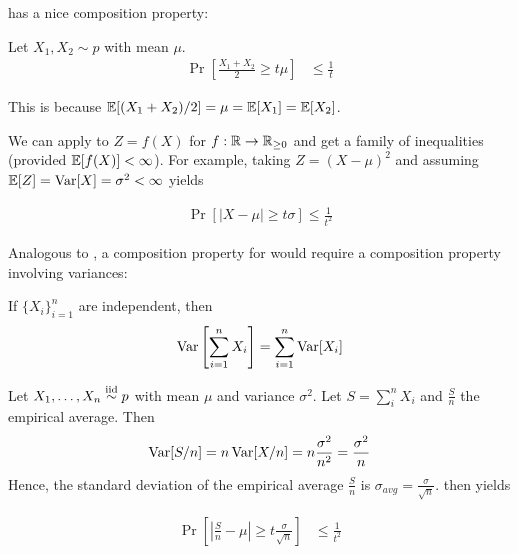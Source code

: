  has a nice composition property:
\begin{theorem}\label{thm:markov-composition}
    Let $X_1, X_2 \sim p$ with mean $\mu$.
    \begin{align}
        \Pr\left[ \frac{X_1 + X_2}{2} \geq t \mu \right] &\leq \frac{1}{t}
    \end{align}
\end{theorem}
This is because $\mathbb{E}[(X_1 + X_2) / 2] = \mu = \mathbb{E}[X_1] = \mathbb{E}[X_2]$.

We can apply  to $Z = f(X)$ for $f : \mathbb{R} \to \mathbb{R}_{\geq 0}$
and get a family of inequalities
(provided $\mathbb{E}[f(X)] < \infty$).
For example, taking $Z = (X - \mu)^2$ and assuming $\mathbb{E}[Z] = \operatorname{Var}[X] = \sigma^2 < \infty$ yields
\begin{theorem}\label{thm:chebyshev}
    \begin{align}
        \Pr[\lvert X - \mu\rvert \geq t \sigma] \leq \frac{1}{t^2}
    \end{align}
\end{theorem}

Analogous to ,
a composition property for  would require a composition property involving variances:
\begin{theorem}
    If $\{X_i\}_{i=1}^n$ are independent, then
    \begin{align}
        \operatorname{Var}\left[ \sum_{i=1}^n X_i \right] = \sum_{i=1}^n \operatorname{Var}[X_i]
    \end{align}
\end{theorem}

\begin{example}
    Let $X_1, \ldots, X_n \overset{\text{iid}}{\sim} p$ with mean $\mu$ and variance $\sigma^2$.
    Let $S = \sum_i^n X_i$ and $\frac{S}{n}$ the empirical average. Then
    \begin{align}
        \operatorname{Var}[S/n] = n \operatorname{Var}[X/n] = n \frac{\sigma^2}{n^2} = \frac{\sigma^2}{n}
    \end{align}
    Hence, the standard deviation of the empirical average $\frac{S}{n}$ is $\sigma_{avg} = \frac{\sigma}{\sqrt{n}}$.
     then yields
    \begin{corollary}\label{cor:chebyshev-empirical-avg-concentration}
        \begin{align}
            \Pr\left[
                \left\lvert \frac{S}{n} - \mu \right\rvert \geq t \frac{\sigma}{\sqrt{n}}
            \right] &\leq \frac{1}{t^2}
        \end{align}
    \end{corollary}
\end{example}

